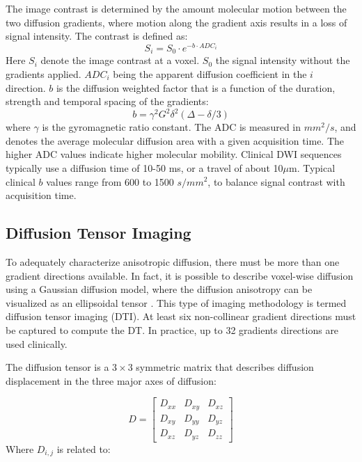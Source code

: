 The image contrast is determined by the amount molecular motion between the two diffusion gradients, where motion along the gradient axis results in a loss of signal intensity. The contrast is defined as: 
\begin{equation}
S_i = S_0 \cdot e^{-b \cdot ADC_i}
\end{equation}
Here $S_i$ denote the image contrast at a voxel. $S_0$ the signal intensity without the gradients applied. $ADC_i$ being the apparent diffusion coefficient in the $i$ direction. $b$ is the diffusion weighted factor that is a function of the duration, strength and temporal spacing of the gradients: 
\begin{equation}
b = \gamma^2 G^2 \delta^2(\Delta - \delta/3)
\end{equation}
where $\gamma$ is the gyromagnetic ratio constant. The ADC is measured in $mm^2/s$, and denotes the average molecular diffusion area with a given acquisition time. The higher ADC values indicate higher molecular mobility. Clinical DWI sequences typically use a diffusion time of 10-50 ms, or a travel of about 10$\mu$m. Typical clinical $b$ values range from 600 to 1500 $s/mm^2$, to balance signal contrast with acquisition time. 

\subsection{Diffusion Tensor Imaging}

To adequately characterize anisotropic diffusion, there must be more than one gradient directions available. In fact, it is possible to describe voxel-wise diffusion using a Gaussian diffusion model, where the diffusion anisotropy can be visualized as an ellipsoidal tensor \cite{Jones2002}. This type of imaging methodology is termed diffusion tensor imaging (DTI). At least six non-collinear gradient directions must be captured to compute the DT. In practice, up to 32 gradients directions are used clinically.

The diffusion tensor is a $3 \times 3$ symmetric matrix that describes diffusion displacement in the three major axes of diffusion: 

\begin{equation}
D=
\begin{bmatrix}
    D_{xx} & D_{xy} & D_{xz} \\
    D_{xy} & D_{yy} & D_{yz} \\
    D_{xz} & D_{yz} & D_{zz}
\end{bmatrix}
\end{equation}
Where $D_{i,j}$ is related to:

